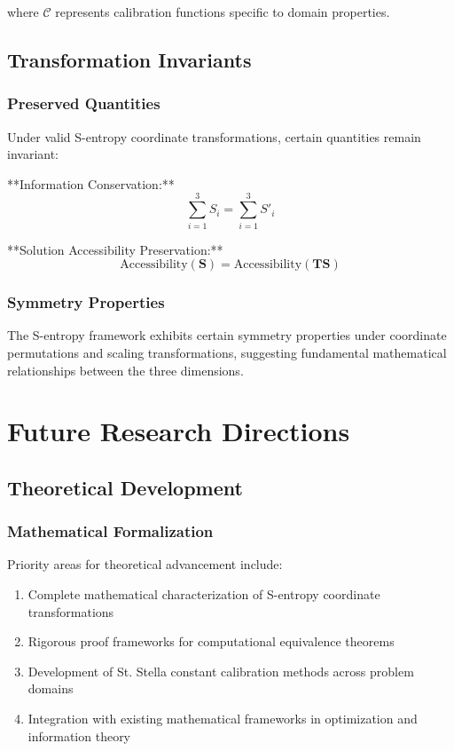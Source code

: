 \documentclass[12pt,a4paper]{article}
\begin{document}
where $\mathcal{C}$ represents calibration functions specific to domain properties.

\subsection{Transformation Invariants}

\subsubsection{Preserved Quantities}

Under valid S-entropy coordinate transformations, certain quantities remain invariant:

**Information Conservation:**
\begin{equation}
\sum_{i=1}^{3} S_i = \sum_{i=1}^{3} S'_i
\label{eq:information_conservation}
\end{equation}

**Solution Accessibility Preservation:**
\begin{equation}
\text{Accessibility}(\mathbf{S}) = \text{Accessibility}(\mathbf{T}\mathbf{S})
\label{eq:accessibility_preservation}
\end{equation}

\subsubsection{Symmetry Properties}

The S-entropy framework exhibits certain symmetry properties under coordinate permutations and scaling transformations, suggesting fundamental mathematical relationships between the three dimensions.

\section{Future Research Directions}

\subsection{Theoretical Development}

\subsubsection{Mathematical Formalization}

Priority areas for theoretical advancement include:

\begin{enumerate}
\item Complete mathematical characterization of S-entropy coordinate transformations
\item Rigorous proof frameworks for computational equivalence theorems
\item Development of St. Stella constant calibration methods across problem domains
\item Integration with existing mathematical frameworks in optimization and information theory
\end{enumerate}
\end{document}
